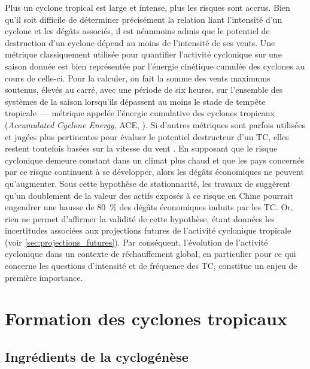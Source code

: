\documentclass[../main.tex]{subfiles}
\begin{document}
Plus un cyclone tropical est large et intense, plus les risques sont accrus. Bien qu'il soit difficile de déterminer précisément la relation liant l'intensité
d'un cyclone et les dégâts associés, il est néanmoins admis que le potentiel de destruction d'un cyclone dépend au moins de l'intensité de ses vents. Une
métrique classiquement utilisée pour quantifier l'activité cyclonique sur une saison donnée est bien représentée par l'énergie cinétique cumulée des cyclones au
cours de celle-ci. Pour la calculer, on fait la somme des vents maximums soutenus, élevés au carré, avec une période de six heures, sur l'ensemble des systèmes
de la saison lorsqu'ils dépassent au moins le stade de tempête tropicale~--- métrique appelée l'énergie cumulative des cyclones tropicaux (\textit{Accumulated
Cyclone Energy}, ACE, \textcite{bell_climate_2000}). Si d'autres métriques sont parfois utilisées et jugées plus pertinentes pour évaluer le potentiel destructeur
d'un TC, elles restent toutefois basées sur la vitesse du vent \parencite{powell_tropical_2007}. En supposant que le risque cyclonique demeure constant
dans un climat plus chaud et que les pays concernés par ce risque continuent à se développer, alors les dégâts économiques ne peuvent qu'augmenter. Sous cette
hypothèse de stationnarité, les travaux de \textcite{ye_dependence_2020} suggèrent qu'un doublement de la valeur des actifs exposés à ce risque en Chine pourrait
engendrer une hausse de \SI{80}{\percent} des dégâts économiques induits par les TC. Or, rien ne permet d'affirmer la validité de cette hypothèse, étant données
les incertitudes associées aux projections futures de l'activité cyclonique tropicale (voir \cref{sec:projections_futures}). Par conséquent, l'évolution de
l'activité cyclonique dans un contexte de réchauffement global, en particulier pour ce qui concerne les questions d'intensité et de fréquence des TC, constitue
un enjeu de première importance.

\section{Formation des cyclones tropicaux}
  
\subsection{Ingrédients de la cyclogénèse}\label{sec:conditions_cyclogenese}
\end{document}
